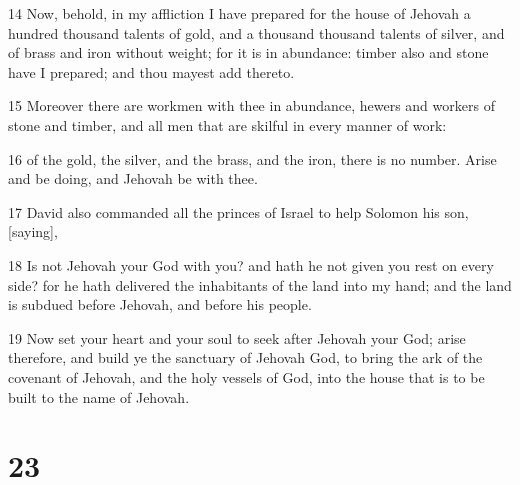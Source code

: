 \par 14 Now, behold, in my affliction I have prepared for the house of Jehovah a hundred thousand talents of gold, and a thousand thousand talents of silver, and of brass and iron without weight; for it is in abundance: timber also and stone have I prepared; and thou mayest add thereto.
\par 15 Moreover there are workmen with thee in abundance, hewers and workers of stone and timber, and all men that are skilful in every manner of work:
\par 16 of the gold, the silver, and the brass, and the iron, there is no number. Arise and be doing, and Jehovah be with thee.
\par 17 David also commanded all the princes of Israel to help Solomon his son, [saying],
\par 18 Is not Jehovah your God with you? and hath he not given you rest on every side? for he hath delivered the inhabitants of the land into my hand; and the land is subdued before Jehovah, and before his people.
\par 19 Now set your heart and your soul to seek after Jehovah your God; arise therefore, and build ye the sanctuary of Jehovah God, to bring the ark of the covenant of Jehovah, and the holy vessels of God, into the house that is to be built to the name of Jehovah.

\chapter{23}

